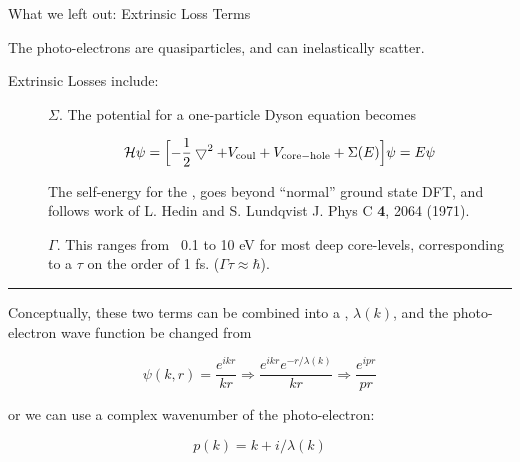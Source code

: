 \begin{slide}{What we left out: Extrinsic Loss Terms}

    \vmm
    
    The photo-electrons are quasiparticles, and can inelastically scatter.

    \vmm 

    Extrinsic Losses include:
    
    \begin{description}
    \item[{}] $\Sigma$.  The potential for a one-particle Dyson
      equation becomes 
      
      \[ {\cal{H}}\psi = \Bigl[ -{\frac{1}{2}}\bigtriangledown^2 + V_{\rm
        coul} + V_{\rm core-hole} + \Sigma(E) \Bigr] \psi = E\psi
      \]

      
      The self-energy for the {}, goes beyond
      ``normal'' ground state DFT, and follows work of L. Hedin and S.
      Lundqvist J. Phys C {\bf{4}}, 2064 (1971).

      
    \item[{}] $\Gamma$.  This ranges from ~0.1 to
      10 eV for most deep core-levels, corresponding to a
      {} $\tau$ on the order of 1 fs.  ($\Gamma
      \tau \approx \hbar$).

    \end{description}

    \vmm \hrule \vmm

    Conceptually, these two terms can be combined into a {}, $\lambda(k)$,  and the photo-electron wave function be changed from
    
    \begin{equation*} 
      \psi(k,r)  =  {\frac{e^{ikr}}{kr}} \Rightarrow   {\frac{e^{ikr}e^{-r/\lambda(k)}}{kr}}
      \Rightarrow {\frac{e^{ipr}}{pr}}
    \end{equation*} 

    or we can use a complex wavenumber of the photo-electron:

    \[p(k) = k + i / \lambda(k) \] 


\vfill
\end{slide} 
